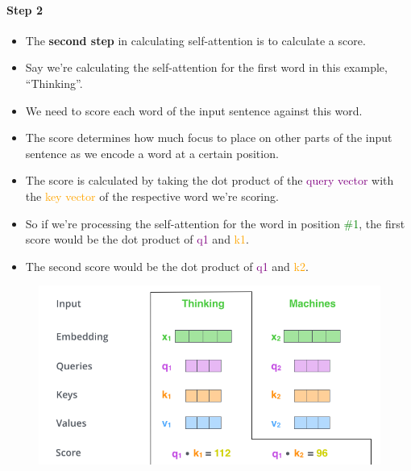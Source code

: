 \paragraph{Step 2}

\begin{itemize}
\item The \textbf{second step} in calculating self-attention is to calculate a score. 

\item Say we’re calculating the self-attention for the first word in this example, ``Thinking''.

\item We need to score each word of the input sentence against this word. 

\item The score determines how much focus to place on other parts of the input sentence as we encode a word at a certain position.

\item The score is calculated by taking the dot product of the \textcolor{purple}{query vector} with the \textcolor{orange}{key vector} of the respective word we're scoring. 
\item So if we're processing the self-attention for the word in position \textcolor{green}{\#1}, the first score would be the dot product of \textcolor{purple}{q1} and \textcolor{orange}{k1}.
\item The second score would be the dot product of \textcolor{purple}{q1} and \textcolor{orange}{k2}.

\end{itemize}


\begin{figure}[h]
        	\includegraphics[scale = 0.4]{pics/transformer_self_attention_score.png}
        \end{figure} 




